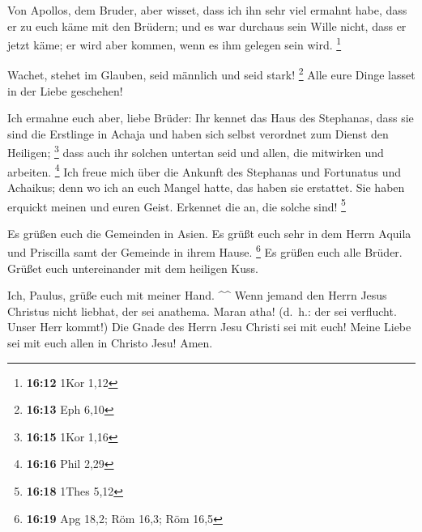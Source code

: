  Von Apollos, dem Bruder, aber wisset, dass ich ihn sehr
viel ermahnt habe, dass er zu euch käme mit den Brüdern; und es war
durchaus sein Wille nicht, dass er jetzt käme; er wird aber kommen, wenn
es ihm gelegen sein wird. \footnote{\textbf{16:12} 1Kor 1,12}

 Wachet, stehet im Glauben, seid männlich und seid stark!
\footnote{\textbf{16:13} Eph 6,10}  Alle eure Dinge
lasset in der Liebe geschehen!

 Ich ermahne euch aber, liebe Brüder: Ihr kennet das Haus
des Stephanas, dass sie sind die Erstlinge in Achaja und haben sich
selbst verordnet zum Dienst den Heiligen; \footnote{\textbf{16:15} 1Kor
  1,16}  dass auch ihr solchen untertan seid und allen,
die mitwirken und arbeiten. \footnote{\textbf{16:16} Phil 2,29}
 Ich freue mich über die Ankunft des Stephanas und
Fortunatus und Achaikus; denn wo ich an euch Mangel hatte, das haben sie
erstattet.  Sie haben erquickt meinen und euren Geist.
Erkennet die an, die solche sind! \footnote{\textbf{16:18} 1Thes 5,12}

 Es grüßen euch die Gemeinden in Asien. Es grüßt euch
sehr in dem Herrn Aquila und Priscilla samt der Gemeinde in ihrem Hause.
\footnote{\textbf{16:19} Apg 18,2; Röm 16,3; Röm 16,5} 
Es grüßen euch alle Brüder. Grüßet euch untereinander mit dem heiligen
Kuss.

 Ich, Paulus, grüße euch mit meiner Hand. \^{}\^{}
 Wenn jemand den Herrn Jesus Christus nicht liebhat, der
sei anathema. Maran atha! (d.~h.: der sei verflucht. Unser Herr kommt!)
 Die Gnade des Herrn Jesu Christi sei mit euch!
 Meine Liebe sei mit euch allen in Christo Jesu! Amen.
